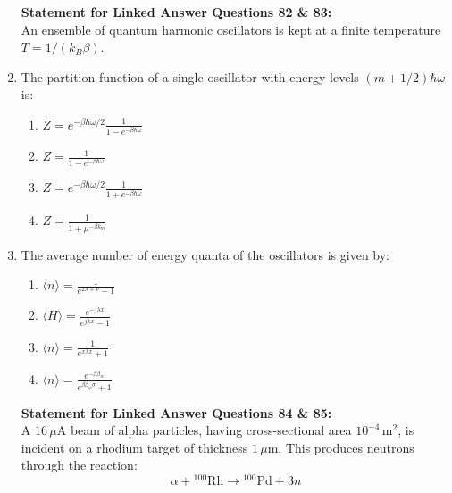 \documentclass[journal,12pt,onecolumn]{IEEEtran}
\begin{document}
\begin{enumerate}[itemsep = 1em]
\newpage

\textbf{Statement for Linked Answer Questions 82 \& 83:} \\
An ensemble of quantum harmonic oscillators is kept at a finite temperature $T = 1/(k_B \beta)$.

\item The partition function of a single oscillator with energy levels $(m + 1/2)\hbar \omega$ is:

\hfill{}

\begin{multicols}{2}
\begin{enumerate}
    \item $Z = e^{-\beta \hbar \omega /2} \frac{1}{1 - e^{-\beta \hbar \omega}}$
    \item $Z = \frac{1}{1 - e^{-\beta \hbar \omega}}$
    \item $Z = e^{-\beta \hbar \omega /2} \frac{1}{1 + e^{-\beta \hbar \omega}}$
    \item $Z = \frac{1}{1 + \mu^{-\beta k_m}}$
\end{enumerate}
\end{multicols}

\item The average number of energy quanta of the oscillators is given by:

\hfill{}

\begin{multicols}{2}
\begin{enumerate}
    \item $\langle n \rangle = \frac{1}{e^{2\lambda + \nu} - 1}$
    \item $\langle H \rangle = \frac{e^{-j \lambda x}}{e^{j \lambda x} - 1}$
    \item $\langle n \rangle = \frac{1}{e^{x \lambda x} + 1}$
    \item $\langle n \rangle = \frac{e^{-\beta \beta_w}}{e^{\beta \beta_w \sigma} + 1}$
\end{enumerate}
\end{multicols}


\textbf{Statement for Linked Answer Questions 84 \& 85:} \\
A $16\,\mu\mathrm{A}$ beam of alpha particles, having cross-sectional area $10^{-4}\,\mathrm{m^2}$, is incident on a rhodium target of thickness $1\,\mu\mathrm{m}$. This produces neutrons through the reaction:  
\[
\alpha + {}^{100}\mathrm{Rh} \rightarrow {}^{100}\mathrm{Pd} + 3n
\]


\end{enumerate}
\end{document}
